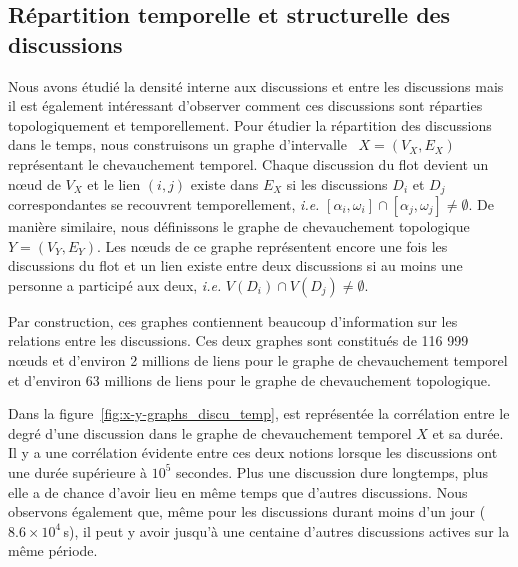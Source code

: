 \subsection{Répartition temporelle et structurelle des discussions}

Nous avons étudié la densité interne aux discussions et entre les discussions mais il est également intéressant d'observer comment ces discussions sont réparties topologiquement et temporellement.
Pour étudier la répartition des discussions dans le temps, nous construisons un graphe d'intervalle~\cite{Lekkeikerker} $X=(V_X,E_X)$ représentant le chevauchement temporel.
Chaque discussion du flot devient un n\oe{}ud de $V_X$ et le lien $(i,j)$ existe dans $E_X$ si les discussions $D_i$ et $D_j$ correspondantes se recouvrent temporellement, \emph{i.e.} $[\alpha_i, \omega_i] \cap [\alpha_j, \omega_j] \neq \emptyset$.
De manière similaire, nous définissons le graphe de chevauchement topologique $Y=(V_Y,E_Y)$.
Les n\oe{}uds de ce graphe représentent encore une fois les discussions du flot et un lien existe entre deux discussions si au moins une personne a participé aux deux, \emph{i.e.} $V(D_i) \cap V(D_j) \neq \emptyset$.

Par construction, ces graphes contiennent beaucoup d'information sur les relations entre les discussions.
Ces deux graphes sont constitués de 116 999 n\oe{}uds et d'environ 2 millions de liens pour le graphe de chevauchement temporel et d'environ 63 millions de liens pour le graphe de chevauchement topologique.



Dans la figure~\ref{fig:x-y-graphs_discu_temp}, est représentée la corrélation entre le degré d'une discussion dans le graphe de chevauchement temporel $X$ et sa durée.
Il y a une corrélation évidente entre ces deux notions lorsque les discussions ont une durée supérieure à $10^5$ secondes.
Plus une discussion dure longtemps, plus elle a de chance d'avoir lieu en même temps que d'autres discussions.
Nous observons également que, même pour les discussions durant moins d'un jour ($8.6 \times 10^4$\,s), il peut y avoir jusqu'à une centaine d'autres discussions actives sur la même période.

